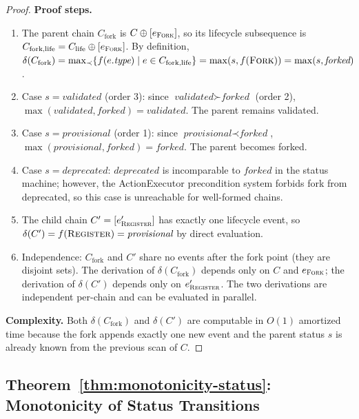 \begin{proof}
\textbf{Proof steps.}
\begin{enumerate}[label=Step~\arabic*:,leftmargin=2em]
    \item The parent chain $C_{\text{fork}}$ is $C \oplus [e_{\textsc{Fork}}]$, so its lifecycle subsequence is $C_{\text{fork,life}} = C_{\text{life}} \oplus [e_{\textsc{Fork}}]$. By definition, $\delta(C_{\text{fork}}) = \max_{\prec}\{f(e.\textit{type}) \mid e \in C_{\text{fork,life}}\} = \max(s, f(\textsc{Fork})) = \max(s, \textit{forked})$.
    \item Case $s = \textit{validated}$ (order 3): since $\textit{validated} \succ \textit{forked}$ (order 2), $\max(\textit{validated}, \textit{forked}) = \textit{validated}$. The parent remains validated.
    \item Case $s = \textit{provisional}$ (order 1): since $\textit{provisional} \prec \textit{forked}$, $\max(\textit{provisional}, \textit{forked}) = \textit{forked}$. The parent becomes forked.
    \item Case $s = \textit{deprecated}$: $\textit{deprecated}$ is incomparable to $\textit{forked}$ in the status machine; however, the ActionExecutor precondition system forbids fork from deprecated, so this case is unreachable for well-formed chains.
    \item The child chain $C' = [e'_{\textsc{Register}}]$ has exactly one lifecycle event, so $\delta(C') = f(\textsc{Register}) = \textit{provisional}$ by direct evaluation.
    \item Independence: $C_{\text{fork}}$ and $C'$ share no events after the fork point (they are disjoint sets). The derivation of $\delta(C_{\text{fork}})$ depends only on $C$ and $e_{\textsc{Fork}}$; the derivation of $\delta(C')$ depends only on $e'_{\textsc{Register}}$. The two derivations are independent per-chain and can be evaluated in parallel.
\end{enumerate}

\textbf{Complexity.} Both $\delta(C_{\text{fork}})$ and $\delta(C')$ are computable in $O(1)$ amortized time because the fork appends exactly one new event and the parent status $s$ is already known from the previous scan of $C$.
\end{proof}

\subsection{Theorem~\ref{thm:monotonicity-status}: Monotonicity of Status Transitions}

